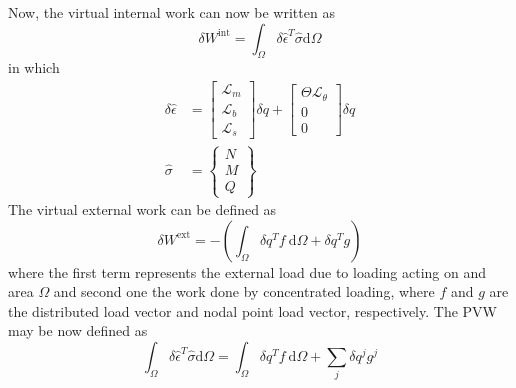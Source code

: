 \documentclass[12pt]{article}
\numberwithin{equation}{section}
\begin{document}
Now, the virtual internal work can now be written as
%
\begin{equation}
    \delta W^{\text{int}} = \int_\Omega
    \delta \hat{\epsilon}^T \hat{\sigma}
    \text{d}\Omega
    \label{eq:strain_energy_4}
\end{equation}
%
in which
%
\begin{subequations}
    \begin{align}
        \delta \hat{\epsilon} & =
        \begin{bmatrix}
            \mathcal{L}_m \\
            \mathcal{L}_b \\
            \mathcal{L}_s
        \end{bmatrix} \delta q +
        \begin{bmatrix}
            \Theta \mathcal{L}_\theta \\
            0                         \\
            0
        \end{bmatrix} \delta q \\
        \hat{\sigma}          & =
        \begin{Bmatrix}
            N \\
            M \\
            Q
        \end{Bmatrix}
    \end{align}
    \label{eq:strain_variation_sigma_hat}
\end{subequations}
% 
The virtual external work can be defined as
%
\begin{equation}
    \delta W^{\text{ext}} = -
    \left(
    \int_\Omega \delta q^T f ~ \text{d} \Omega + \delta q^T g
    \right)
\end{equation}
%
where the first term represents the external load due to loading acting on and area \( \Omega \) and second one the work done by concentrated loading, where \( f \) and \( g \) are the distributed load vector and nodal point load vector, respectively. The PVW may be now defined as
%
\begin{equation}
    \int_\Omega
    \delta \hat{\epsilon}^T \hat{\sigma}
    \text{d}\Omega =
    \int_\Omega \delta q^T f ~ \text{d} \Omega + \sum_j \delta q^j g^j
    \label{eq:pvw_2}
\end{equation}
\end{document}
